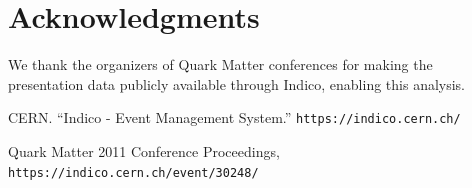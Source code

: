 \documentclass[a4paper,11pt]{article}
\begin{document}
\section{Acknowledgments}

We thank the organizers of Quark Matter conferences for making the presentation data publicly available through Indico, enabling this analysis.


\begin{thebibliography}{9}
CERN. ``Indico - Event Management System.'' 
\texttt{https://indico.cern.ch/}

Quark Matter 2011 Conference Proceedings,
\texttt{https://indico.cern.ch/event/30248/}

\end{thebibliography}
\end{document}
